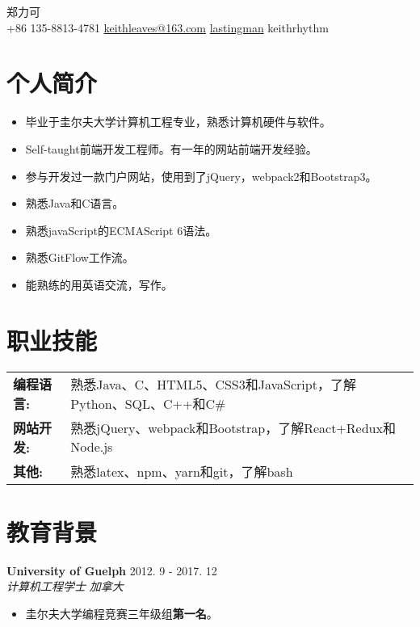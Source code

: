 \documentclass[10pt, letterpaper]{article}
\makeatletter
\newcommand*{\nametitle}[1]{{\fontsize{32pt}{1em}\color{awesome-emerald} #1 \\[0.6\baselineskip]}}
\newcommand*{\subinfo}[2]{\hspace{5pt} {\color{darktext}#1} \hspace*{2pt} {\color{lighttext}#2} \hspace{5pt}}
\newcommand{\information}[4]{
	\noindent
    \textbf{\color{darktext}#1} \hfill {#2} \\
    \textit{\color{hardtext}#3} \hfill \textit{\color{awesome-emerald}#4}
}
\newenvironment{skills}{
    \noindent
    \begin{tabular}{@{}l l@{}}
}{
    \end{tabular}
}
\newcommand*{\skill}[2]{
	\textbf{\color{darktext}#1} & {#2} \\
}
\makeatother
\begin{document}
\begin{center}
\nametitle{郑力可}
\subinfo{\faPhoneSquare}{+86 135-8813-4781}
\subinfo{\faEnvelope}{\href{mailto: keithleaves@163.com}{keithleaves@163.com}}
\subinfo{\faGithub}{\href{https://github.com/lastingman}{lastingman}}
\subinfo{\faWechat}{keithrhythm}
\end{center}


\color{lighttext}

\section*{个人简介}
\noindent
\begin{itemize}[leftmargin=*]
    \item 毕业于圭尔夫大学计算机工程专业，熟悉计算机硬件与软件。
    \item Self-taught前端开发工程师。有一年的网站前端开发经验。
    \item 参与开发过一款门户网站，使用到了jQuery，webpack2和Bootstrap3。
    \item 熟悉Java和C语言。
    \item 熟悉javaScript的ECMAScript 6语法。
    \item 熟悉GitFlow工作流。
    \item 能熟练的用英语交流，写作。
\end{itemize}

\section*{职业技能}
\begin{skills}
\skill{编程语言:}{熟悉Java、C、HTML5、CSS3和JavaScript，了解Python、SQL、C++和C\#}
\skill{网站开发:}{熟悉jQuery、webpack和Bootstrap，了解React+Redux和Node.js}
\skill{其他:}{熟悉latex、npm、yarn和git，了解bash}
\end{skills}

\section*{教育背景}

\information
	{University of Guelph}{2012. 9 - 2017. 12}
	{计算机工程学士}{加拿大}
\begin{itemize}[leftmargin=*]
\item 圭尔夫大学编程竞赛三年级组\textbf{第一名}。
\end{itemize}
\end{document}

